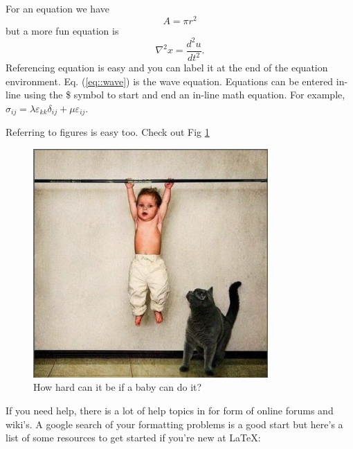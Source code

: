 For an equation we have 
\begin{equation}
	A = \pi r^2
\end{equation}
but a more fun equation is
\begin{equation}
	\nabla^2 x = \frac{d^2 u}{d t^2}.
    \label{eq::wave}
\end{equation}
Referencing equation is easy and you can label it at the end of the equation environment. Eq. (\ref{eq::wave}) is the wave equation. Equations can be entered in-line using the \$ symbol to start and end an in-line math equation. For example, $\sigma_{ij} = \lambda \varepsilon_{kk} \delta_{ij} + \mu \varepsilon_{ij} $. 


Referring to figures is easy too. Check out Fig \ref{fig::easy} 

\begin{figure}[!ht]
	\includegraphics[width=0.8\textwidth]{babydoingpullups}
    \caption{How hard can it be if a baby can do it?}
    \label{fig::easy}
\end{figure}

If you need help, there is a lot of help topics in for form of online forums and wiki's. A google search of your formatting problems is a good start but here's a list of some resources to get started if you're new at \LaTeX:

